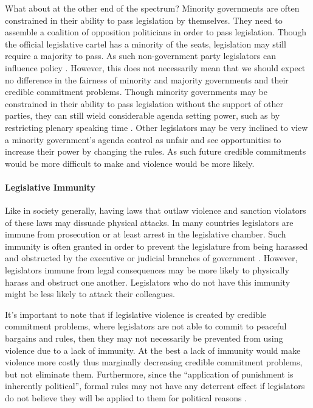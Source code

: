 \documentclass[a4paper]{article}\usepackage[]{graphicx}\usepackage[]{color}
\begin{document}
What about at the other end of the spectrum? Minority governments are often constrained in their ability to pass legislation by themselves. They need to assemble a coalition of opposition politicians in order to pass legislation. Though the official legislative cartel has a minority of the seats, legislation may still require a majority to pass. As such non-government party legislators can influence policy \citep{strom1990minority}. However, this does not necessarily mean that we should expect no difference in the fairness of minority and majority governments and their credible commitment problems. Though minority governments may be constrained in their ability to pass legislation without the support of other parties, they can still wield considerable agenda setting power, such as by restricting plenary speaking time \citep{Tsebelis2002,cox2005,cox2007}. Other legislators may be very inclined to view a minority government's agenda control as unfair and see opportunities to increase their power by changing the rules. As such future credible commitments would be more difficult to make and violence would be more likely.

\paragraph{Legislative Immunity}

Like in society generally, having laws that outlaw violence and sanction violators of these laws may dissuade physical attacks. In many countries legislators are immune from prosecution or at least arrest in the legislative chamber. Such immunity is often granted in order to prevent the legislature from being harassed and obstructed by the executive or judicial branches of government  \citep{Seghetti1984}. However, legislators immune from legal consequences may be more likely to physically harass and obstruct one another. Legislators who do not have this immunity might be less likely to attack their colleagues.

It's important to note that if legislative violence is created by credible commitment problems, where legislators are not able to commit to peaceful bargains and rules, then they may not necessarily be prevented from using violence due to a lack of immunity. At the best a lack of immunity would make violence more costly thus marginally decreasing credible commitment problems, but not eliminate them. Furthermore, since the ``application of punishment is inherently political'', formal rules may not have any deterrent effect if legislators do not believe they will be applied to them for political reasons \cite[58]{Wolfe2004}.
\end{document}
